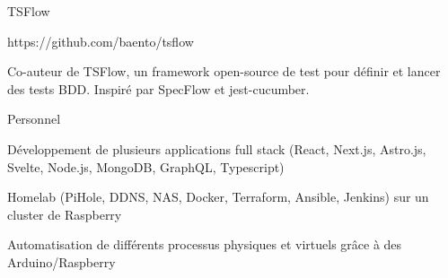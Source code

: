 
\begin{cventries}
  \cventry
    {} %
    {TSFlow} %
    {} %
    {} %
    {
      \begin{cvitems} %
        \item {https://github.com/baento/tsflow}
        \item {Co-auteur de TSFlow, un framework open-source de test pour définir et lancer des tests BDD. Inspiré par SpecFlow et jest-cucumber.}
      \end{cvitems}
    }

  \cventry
    {} %
    {Personnel} %
    {} %
    {} %
    {
      \begin{cvitems} %
        \item {Développement de plusieurs applications full stack (React, Next.js, Astro.js, Svelte, Node.js, MongoDB, GraphQL, Typescript)}
        \item {Homelab (PiHole, DDNS, NAS, Docker, Terraform, Ansible, Jenkins) sur un cluster de Raspberry}
		\item {Automatisation de différents processus physiques et virtuels grâce à des Arduino/Raspberry}
      \end{cvitems}
    }

\end{cventries}